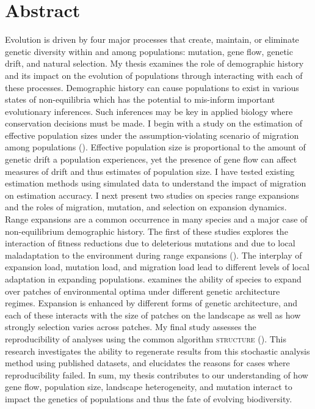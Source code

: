 \chapter*{Abstract}

Evolution is driven by four major processes that create, maintain, or eliminate genetic diversity within and among populations: mutation, gene flow, genetic drift, and natural selection. My thesis examines the role of demographic history and its impact on the evolution of populations through interacting with each of these processes. Demographic history can cause populations to exist in various states of non-equilibria which has the potential to mis-inform important evolutionary inferences. Such inferences may be key in applied biology where conservation decisions must be made. I begin with a study on the estimation of effective population sizes under the assumption-violating scenario of migration among populations (). Effective population size is proportional to the amount of genetic drift a population experiences, yet the presence of gene flow can affect measures of drift and thus estimates of population size. I have tested existing estimation methods using simulated data to understand the impact of migration on estimation accuracy. I next present two studies on species range expansions and the roles of migration, mutation, and selection on expansion dynamics. Range expansions are a common occurrence in many species and a major case of non-equilibrium demographic history. The first of these studies explores the interaction of fitness reductions due to deleterious mutations and due to local maladaptation to the environment during range expansions (). The interplay of expansion load, mutation load, and migration load lead to different levels of local adaptation in expanding populations.  examines the ability of species to expand over patches of environmental optima under different genetic architecture regimes. Expansion is enhanced by different forms of genetic architecture, and each of these interacts with the size of patches on the landscape as well as how strongly selection varies across patches. My final study assesses the reproducibility of analyses using the common algorithm \textsc{structure} (). This research investigates the ability to regenerate results from this stochastic analysis method using published datasets, and elucidates the reasons for cases where reproducibility failed. In sum, my thesis contributes to our understanding of how gene flow, population size, landscape heterogeneity, and mutation interact to impact the genetics of populations and thus the fate of evolving biodiversity.

